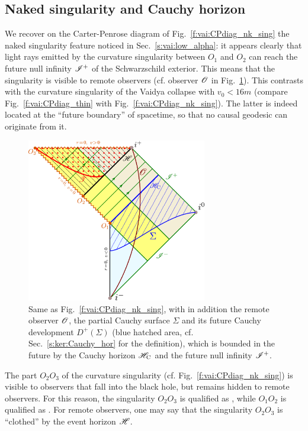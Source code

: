 \subsection{Naked singularity and Cauchy horizon} \label{s:vai:nak_Cauchy}

We recover on the Carter-Penrose diagram of Fig.~\ref{f:vai:CPdiag_nk_sing}
the naked singularity feature noticed in Sec.~\ref{s:vai:low_alpha}:
it appears clearly
that light rays emitted by the curvature singularity
between $O_1$ and $O_2$ can reach the future null infinity $\mathscr{I}^+$ of the
Schwarzschild exterior. This means that the singularity is visible to
remote observers (cf. observer $\mathscr{O}$ in Fig.~\ref{f:vai:CPdiag_Cauchy}).
This contrasts with the curvature singularity of the
Vaidya collapse with $v_0 < 16 m$ (compare Fig.~\ref{f:vai:CPdiag_thin}
with Fig.~\ref{f:vai:CPdiag_nk_sing}).
The latter is indeed located at the ``future boundary'' of spacetime, so that
no causal geodesic can originate from it.

\begin{figure}
\centerline{\includegraphics[width=0.7\textwidth]{vai_CPdiag_Cauchy.pdf}}
\caption[]{\label{f:vai:CPdiag_Cauchy} \footnotesize
Same as Fig.~\ref{f:vai:CPdiag_nk_sing}, with in addition the remote
observer $\mathscr{O}$, the partial Cauchy surface $\Sigma$ and its future Cauchy development $D^+(\Sigma)$ (blue hatched area, cf. Sec.~\ref{s:ker:Cauchy_hor} for the definition), which is bounded in the future by
the Cauchy horizon $\mathscr{H}_{\rm C}$ and the future null infinity $\mathscr{I}^+$.}
\end{figure}

\begin{remark}
The part $O_2 O_3$ of the curvature singularity (cf. Fig.~\ref{f:vai:CPdiag_nk_sing})
is visible to observers that fall into the black hole, but remains hidden
to remote observers. For this reason, the singularity $O_2 O_3$ is qualified as
,
while $O_1 O_2$ is qualified as
.
For remote observers, one may say that the
singularity $O_2 O_3$ is ``clothed'' by the event horizon $\mathscr{H}$.
\end{remark}


